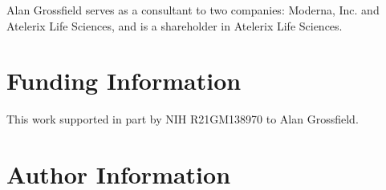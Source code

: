 \documentclass[9pt,training,pubversion]{livecoms}
\begin{document}
Alan Grossfield serves as a consultant to two companies: Moderna, Inc.
and Atelerix Life Sciences, and is a shareholder in Atelerix Life Sciences.

\section{Funding Information}
This work supported in part by NIH R21GM138970 to Alan Grossfield.

\section*{Author Information}
\makeorcid




\end{document}
